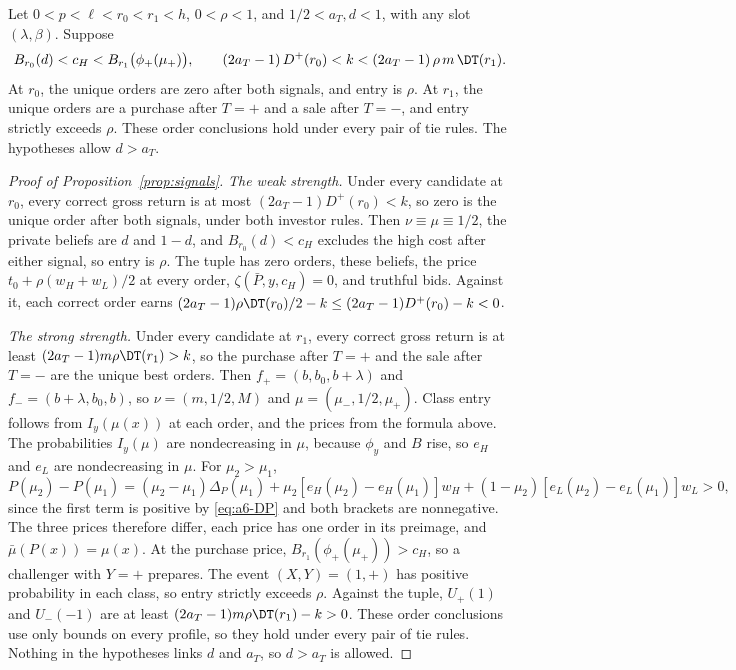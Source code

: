 \begin{proposition}\label{prop:signals}
Let \(0<p<\ell<r_0<r_1<h\), \(0<\rho<1\), and \(1/2<a_T,d<1\), with any slot \((\lambda,\beta)\). Suppose
\[
B_{r_0}(d)<c_H<B_{r_1}\bigl(\phi_+(\mu_+)\bigr),\qquad
(2a_T-1)\,D^+(r_0)<k<(2a_T-1)\,\rho\,m\,\DT(r_1).
\]
At \(r_0\), the unique orders are zero after both signals, and entry is \(\rho\). At \(r_1\), the unique orders are a
purchase after \(T=+\) and a sale after \(T=-\), and entry strictly exceeds \(\rho\). These order conclusions hold
under every pair of tie rules. The hypotheses allow \(d>a_T\).
\end{proposition}

\begin{proof}[Proof of Proposition~\ref{prop:signals}]
\emph{The weak strength.} Under every candidate at \(r_0\), every correct gross return is at most
\((2a_T-1)D^+(r_0)<k\), so zero is the unique order after both signals, under both investor rules. Then
\(\nu\equiv\mu\equiv1/2\), the private beliefs are \(d\) and \(1-d\), and \(B_{r_0}(d)<c_H\) excludes the high cost
after either signal, so entry is \(\rho\). The tuple has zero orders, these beliefs, the price
\(t_0+\rho(w_H+w_L)/2\) at every order, \(\zeta(\bar P,y,c_H)=0\), and truthful bids. Against it, each correct order
earns \((2a_T-1)\rho\DT(r_0)/2-k\le(2a_T-1)D^+(r_0)-k<0\).

\emph{The strong strength.} Under every candidate at \(r_1\), every correct gross return is at least
\((2a_T-1)m\rho\DT(r_1)>k\), so the purchase after \(T=+\) and the sale after \(T=-\) are the unique best orders. Then
\(f_+=(b,b_0,b+\lambda)\) and \(f_-=(b+\lambda,b_0,b)\), so \(\nu=(m,1/2,M)\) and \(\mu=(\mu_-,1/2,\mu_+)\). Class entry
follows from \(I_y(\mu(x))\) at each order, and the prices from the formula above. The probabilities \(I_y(\mu)\) are
nondecreasing in \(\mu\), because \(\phi_y\) and \(B\) rise, so \(e_H\) and \(e_L\) are nondecreasing in \(\mu\). For
\(\mu_2>\mu_1\),
\[
P(\mu_2)-P(\mu_1)=(\mu_2-\mu_1)\Delta_P(\mu_1)+\mu_2[e_H(\mu_2)-e_H(\mu_1)]w_H+(1-\mu_2)[e_L(\mu_2)-e_L(\mu_1)]w_L>0,
\]
since the first term is positive by \eqref{eq:a6-DP} and both brackets are nonnegative. The three prices therefore
differ, each price has one order in its preimage, and \(\bar\mu(P(x))=\mu(x)\). At the purchase price, \(B_{r_1}(\phi_+(\mu_+))>c_H\), so a challenger with
\(Y=+\) prepares. The event \((X,Y)=(1,+)\) has positive probability in each class, so entry strictly exceeds
\(\rho\). Against the tuple, \(U_+(1)\) and \(U_-(-1)\) are at least \((2a_T-1)m\rho\DT(r_1)-k>0\). These order
conclusions use only bounds on every profile, so they hold under every pair of tie rules. Nothing in the hypotheses
links \(d\) and \(a_T\), so \(d>a_T\) is allowed.
\end{proof}

